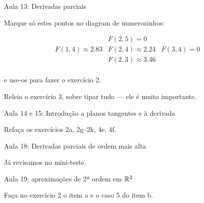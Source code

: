 \documentclass[oneside,12pt]{article}
\begin{document}
Aula 13: Derivadas parciais

Marque só estes pontos no diagram de numerozinhos:

$$\begin{array}{lll}
              & F(2,5) = 0 & \\
F(1,4) ≈ 2.83 & F(2,4) ≈ 2.24 & F(3,4) = 0 \\
              & F(2,3) ≈ 3.46 & \\
\end{array}
$$

e use-os para fazer o exercício 2.

Releia o exercício 3, sobre tipar tudo --- ele é muito importante.


\msk



Aula 14 e 15: Introdução a planos tangentes e à derivada

Refaça os exercícios 2a, 2g--2k, 4e, 4f.

\newpage

Aula 18: Derivadas parciais de ordem mais alta

Já revisamos no mini-teste.


\msk


Aula 19: aproximações de 2ª ordem em $\mathbb{R}^2$

Faça no exercício 2 o item a e o caso 5 do item b.

\msk

\end{document}
